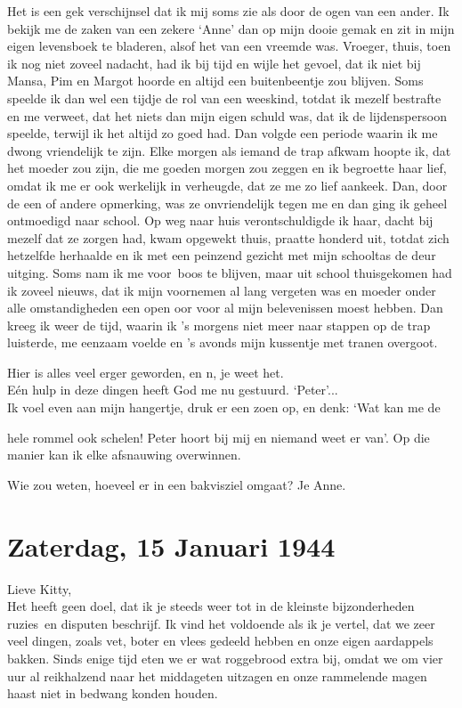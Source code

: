 \documentclass{book}
\begin{document}
Het is een gek verschijnsel dat ik mij soms zie als door de ogen van een
ander. Ik bekijk me de zaken van een zekere `Anne' dan op mijn dooie
gemak en zit in mijn eigen levensboek te bladeren, alsof het van een
vreemde was. Vroeger, thuis, toen ik nog niet zoveel nadacht, had ik bij
tijd en wijle het gevoel, dat ik niet bij Mansa, Pim en Margot hoorde en
altijd een buitenbeentje zou blijven. Soms speelde ik dan wel een tijdje
de rol van een weeskind, totdat ik mezelf bestrafte en me verweet, dat
het niets dan mijn eigen schuld was, dat ik de lijdenspersoon speelde,
terwijl ik het altijd zo goed had. Dan volgde een periode waarin ik me
dwong vriendelijk te zijn. Elke morgen als iemand de trap afkwam hoopte
ik, dat het moeder zou zijn, die me goeden morgen zou zeggen en ik
begroette haar lief, omdat ik me er ook werkelijk in verheugde, dat ze
me zo lief aankeek. Dan, door de een of andere opmerking, was ze
onvriendelijk tegen me en dan ging ik geheel ontmoedigd naar school. Op
weg naar huis verontschuldigde ik haar, dacht bij mezelf dat ze zorgen
had, kwam opgewekt thuis, praatte honderd uit, totdat zich hetzelfde
herhaalde en ik met een peinzend gezicht met mijn schooltas de deur
uitging. Soms nam ik me voor~boos te blijven, maar uit school
thuisgekomen had ik zoveel nieuws, dat ik mijn voornemen al lang
vergeten was en moeder onder alle omstandigheden een open oor voor al
mijn belevenissen moest hebben. Dan kreeg ik weer de tijd, waarin ik 's
morgens niet meer naar stappen op de trap luisterde, me eenzaam voelde
en 's avonds mijn kussentje met tranen overgoot.

Hier is alles veel erger geworden, en n, je weet het.\\Eén hulp in deze
dingen heeft God me nu gestuurd. `Peter'...\\Ik voel even aan mijn
hangertje, druk er een zoen op, en denk: `Wat kan me de

hele rommel ook schelen! Peter hoort bij mij en niemand weet er van'. Op
die manier kan ik elke afsnauwing overwinnen.

Wie zou weten, hoeveel er in een bakvisziel omgaat? Je Anne.

\chapter{Zaterdag, 15 Januari 1944}

Lieve Kitty,\\Het heeft geen doel, dat ik je steeds weer tot in de
kleinste bijzonderheden ruzies~en disputen beschrijf. Ik vind het
voldoende als ik je vertel, dat we zeer veel dingen, zoals vet, boter en
vlees gedeeld hebben en onze eigen aardappels bakken. Sinds enige tijd
eten we er wat roggebrood extra bij, omdat we om vier uur al reikhalzend
naar het middageten uitzagen en onze rammelende magen haast niet in
bedwang konden houden.
\end{document}
